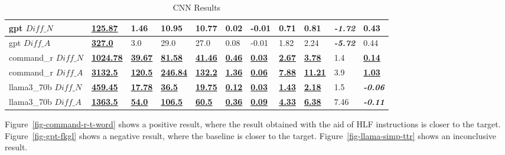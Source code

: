 \documentclass[11pt]{article}
\begin{document}
\begin{table}[htp]
{\begin{tabular}{lllllllllll}
            gpt $Diff\_N$         & \textbf{\underline{125.87}}  & 1.46                       & 10.95                       & 10.77                      & 0.02                      & -0.01                     & 0.71                      & 0.81                       & \textbf{\textit{-1.72}} & 0.43                      \\ \midrule
            gpt $Diff\_A$         & \textbf{\underline{327.0}}   & 3.0                        & 29.0                        & 27.0                       & 0.08                      & -0.01                     & 1.82                      & 2.24                       & \textbf{\textit{-5.72}} & 0.44                      \\ \midrule
            command\_r $Diff\_N$  & \textbf{\underline{1024.78}} & \textbf{\underline{39.67}} & \textbf{\underline{81.58}}  & \textbf{\underline{41.46}} & \textbf{\underline{0.46}} & \textbf{\underline{0.03}} & \textbf{\underline{2.67}} & \textbf{\underline{3.78}}  & 1.4                     & \textbf{\underline{0.14}} \\ \midrule
            command\_r $Diff\_A$  & \textbf{\underline{3132.5}}  & \textbf{\underline{120.5}} & \textbf{\underline{246.84}} & \textbf{\underline{132.2}} & \textbf{\underline{1.36}} & \textbf{\underline{0.06}} & \textbf{\underline{7.88}} & \textbf{\underline{11.21}} & 3.9                     & \textbf{\underline{1.03}} \\ \midrule
            llama3\_70b $Diff\_N$ & \textbf{\underline{459.45}}  & \textbf{\underline{17.78}} & \textbf{\underline{36.5}}   & \textbf{\underline{19.75}} & \textbf{\underline{0.12}} & \textbf{\underline{0.03}} & \textbf{\underline{1.43}} & \textbf{\underline{2.18}}  & 1.5                     & \textbf{\textit{-0.06}}   \\ \midrule
            llama3\_70b $Diff\_A$ & \textbf{\underline{1363.5}}  & \textbf{\underline{54.0}}  & \textbf{\underline{106.5}}  & \textbf{\underline{60.5}}  & \textbf{\underline{0.36}} & \textbf{\underline{0.09}} & \textbf{\underline{4.33}} & \textbf{\underline{6.38}}  & 7.46                    & \textbf{\textit{-0.11}}   \\ \bottomrule
        \end{tabular}%
    }\caption{CNN Results}\label{table-prompt-1-cnn-dailymail}
\end{table}

Figure~\ref{fig-command-r-t-word} shows a positive result, where the result
obtained with the aid of HLF instructions is closer to the target.
Figure~\ref{fig-gpt-fkgl} shows a negative result, where the baseline is closer
to the target.
Figure~\ref{fig-llama-simp-ttr} shows an inconclusive result.
\end{document}
